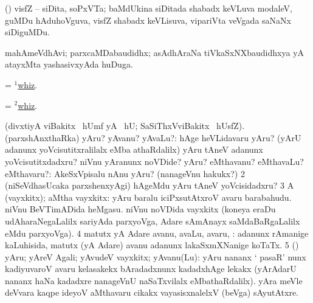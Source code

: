 \bentry
{}
\gl{\nA}
\bmng
(\AmA) visfZ -- siDita, soPxVTa; baMdUkina siDitada shabadx keVLuva modaleV, guMDu hAduhoVguva, visfZ shabadx keVLisuva, vipariVta veVgada saNaNx siDiguMDu. 
\emng
\eentry

\bentry
{}
\gl{\nA}
\bmng
mahAmeVdhAvi; parxcaMDabaudidhx; asAdhAraNa tiVkaSxNXbaudidhxya yA atayxMta yashasivxyAda huDuga. 
\emng
\eentry

\bentry
{} 
\gl{\nA}
\expl{}
\bmng
= \hyperlink{whiz(1)}{$^1$whiz}. 
\emng
\eentry

\bentry
{} 
\gl{\akirx}
\bmng
= \hyperlink{whiz(2)}{$^2$whiz}. 
\emng
\eentry

\bentry
{}
\gl{\saMkiSx}
\expl{}
\bmng
{} 
\emng
\eentry

\bentry
{} 
\gl{\sanA}
\expl{}
\bmng
(divxtiyA viBakitx  \ucAcx\ hUmf yA \AmA {} \ucAcx\ hU; SaSiThxVviBakitx  \ucAcx\ hUsfZ). 
\bnum
{} (parxshAnxthaRka) 
\banum
{} yAru? yAvanu? yAvaLu?:  hAge heVLidavaru yAru?  (yArU adanunx yoVcisutitxralilalx eMba athaRdalilx) yAru tAneV adanunx yoVcisutitxdadxru?    niVnu yAranunx noVDide? 
 yAru? eMthavanu? eMthavaLu? eMthavaru?:  AkeSxVpisalu nAnu yAru? (nanageVnu hakukx?) 
\eanum
\numie
\num{2} (niSeVdhasUcaka parxshenxyAgi)  hAgeMdu yAru tAneV yoVcisidadxru? 
\num{3} A (vayxkitx); aMtha vayxkitx:  yAru baralu iciPxsutAtxroV avaru barabahudu.  niVnu BeVTimADida heMgasu.  niVnu noVDida vayxkitx (koneya eraDu udAharaNegaLalilx  sariyAda parxyoVga, Adare sAmAnayx saMdaBaRgaLalilx  eMdu parxyoVga). 
\num{4} matutx yA Adare avanu, avaLu, avaru, \mo:  adanunx rAmanige kaLuhisida, matutx (yA Adare) avanu adanunx lakaSxmXNanige koTaTx. 
\num{5} (\pArxparx) yAru; yAreV Agali; yAvudeV vayxkitx; yAvanu(Lu):  yAru nananx ` pasaR' nunx kadiyuvaroV avaru kelasakekx bAradadxnunx kadadxhAge lekakx (yArAdarU nananx haNa kadadxre nanageVnU naSaTxvilalx eMbathaRdalilx).  yAra meVle deVvara kaqpe ideyoV aMthavaru cikakx vayasisxnalelxV (beVga) sAyutAtxre. 
\enum
\emng

